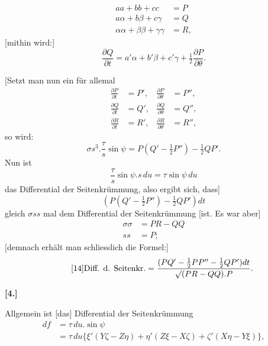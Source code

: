 %
\[
\begin{aligned}
aa+bb+cc&=P\\
a\alpha+b\beta+c\gamma&=Q\\
\alpha\alpha+\beta\beta+\gamma\gamma&=R,
\end{aligned}
\]
[mithin wird:]
\[
\frac{\partial Q}{\partial t}=a'\alpha+b'\beta+c'\gamma+\tfrac12\frac{\partial P}{\partial\theta}.
\]

[Setzt man nun ein für allemal
\[
\begin{aligned}
\frac{\partial P}{\partial t}&=P',&\frac{\partial P}{\partial\theta}&=P'',\\
\frac{\partial Q}{\partial t}&=Q',&\frac{\partial Q}{\partial\theta}&=Q'',\\
\frac{\partial R}{\partial t}&=R',&\frac{\partial R}{\partial\theta}&=R'',
\end{aligned}
\]
so wird:
\[
\sigma s^3.\frac{\tau}{s}\sin\psi=P(Q'-\tfrac12P'')-\tfrac12QP'.
\]
Nun ist
\[
\frac{\tau}{s}\sin\psi.s\,du=\tau\sin\psi\,du
\]
das Differential der Seitenkrümmung, also ergibt sich, dass]
\[
(P(Q'-\tfrac12P'')-\tfrac12QP')dt
\]
gleich $\sigma ss$ mal dem Differential der Seitenkrümmung [ist. Es war aber]
\[
\begin{aligned}
\sigma\sigma&=PR-QQ\\
ss&=P;
\end{aligned}
\]
[demnach erhält man schliesslich die Formel:]
\begin{equation}\tag*{[14]}
\text{Diff. d. Seitenkr.}=\frac{(PQ'-\tfrac12PP''-\tfrac12QP')dt}{\mathord{\surd}(PR-QQ).P}.
\end{equation}
\begin{center}\bfseries [4.]\end{center}
\noindent\hspace*{1.2em}Allgemein ist [das] Differential der Seitenkrümmung
\[
\begin{aligned}
df&=\tau\,du.\sin\psi\\
&=\tau\,du\{\xi'(Y\zeta-Z\eta)+\eta'(Z\xi-X\zeta)+\zeta'(X\eta-Y\xi)\},
\end{aligned}
\]
